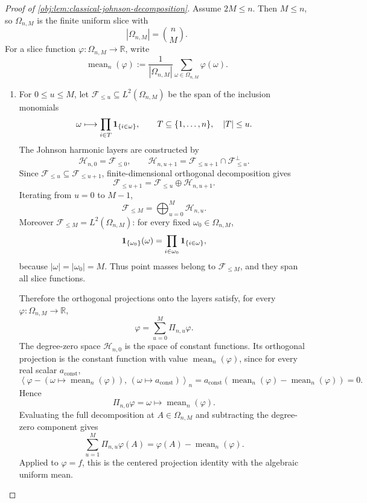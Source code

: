 \documentclass[11pt]{article}
\begin{document}
\begin{proof}[Proof of \cref{obj:lem:classical-johnson-decomposition}]
Assume \(2M\le n\). Then \(M\le n\), so \(\Omega_{n,M}\) is the finite uniform slice with
\[
|\Omega_{n,M}|=\binom nM .
\]
For a slice function \(\varphi:\Omega_{n,M}\to\mathbb R\), write
\[
\operatorname{mean}_n(\varphi)
:=
\frac{1}{|\Omega_{n,M}|}\sum_{\omega\in\Omega_{n,M}}\varphi(\omega).
\]

\begin{enumerate}
\item For \(0\le u\le M\), let \(\mathcal F_{\le u}\subseteq L^2(\Omega_{n,M})\) be the span of the inclusion monomials
\[
\omega\longmapsto \prod_{i\in T}{\bf 1}_{\{i\in\omega\}},
\qquad
T\subseteq\{1,\ldots,n\},\quad |T|\le u .
\]
The Johnson harmonic layers are constructed by
\[
\mathcal H_{n,0}=\mathcal F_{\le 0},
\qquad
\mathcal H_{n,u+1}
=
\mathcal F_{\le u+1}\cap \mathcal F_{\le u}^{\perp}.
\]
Since \(\mathcal F_{\le u}\subseteq \mathcal F_{\le u+1}\), finite-dimensional orthogonal decomposition gives
\[
\mathcal F_{\le u+1}
=
\mathcal F_{\le u}\oplus \mathcal H_{n,u+1}.
\]
Iterating from \(u=0\) to \(M-1\),
\[
\mathcal F_{\le M}
=
\bigoplus_{u=0}^{M}\mathcal H_{n,u}.
\]
Moreover \(\mathcal F_{\le M}=L^2(\Omega_{n,M})\): for every fixed
\(\omega_0\in\Omega_{n,M}\),
\[
{\bf 1}_{\{\omega_0\}}(\omega)
=
\prod_{i\in\omega_0}{\bf 1}_{\{i\in\omega\}},
\]
because \(|\omega|=|\omega_0|=M\). Thus point masses belong to \(\mathcal F_{\le M}\), and they span all slice functions.

Therefore the orthogonal projections onto the layers satisfy, for every
\(\varphi:\Omega_{n,M}\to\mathbb R\),
\[
\varphi
=
\sum_{u=0}^{M}\Pi_{n,u}\varphi .
\]
The degree-zero space \(\mathcal H_{n,0}\) is the space of constant functions. Its orthogonal projection is the constant function with value \(\operatorname{mean}_n(\varphi)\), since for every real scalar \(a_{\mathrm{const}}\),
\[
\left\langle
\varphi-(\omega\mapsto \operatorname{mean}_n(\varphi)),
\,(\omega\mapsto a_{\mathrm{const}})
\right\rangle_n
=
a_{\mathrm{const}}
\left(
\operatorname{mean}_n(\varphi)-\operatorname{mean}_n(\varphi)
\right)
=0 .
\]
Hence
\[
\Pi_{n,0}\varphi=\omega\mapsto \operatorname{mean}_n(\varphi).
\]
Evaluating the full decomposition at \(A\in\Omega_{n,M}\) and subtracting the degree-zero component gives
\[
\sum_{u=1}^{M}\Pi_{n,u}\varphi(A)
=
\varphi(A)-\operatorname{mean}_n(\varphi).
\]
Applied to \(\varphi=f\), this is the centered projection identity with the algebraic uniform mean. %


\end{enumerate}
\end{proof}
\end{document}
